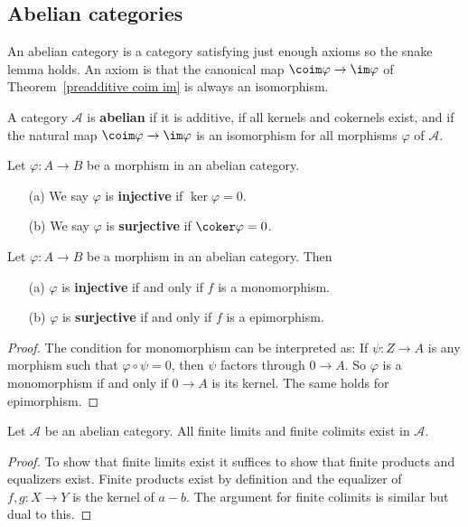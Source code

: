 \subsection{Abelian categories}
An abelian category is a category satisfying just enough axioms so the snake lemma holds. An axiom is that the canonical map $\coim\varphi\to\im\varphi$ of Theorem~\ref{preadditive coim im} is always an isomorphism.
\begin{definition}\label{ab cat def}
A category $\mathcal{A}$ is \textbf{abelian} if it is additive, if all kernels and cokernels exist, and if the natural map $\coim\varphi\to\im\varphi$ is an isomorphism for all morphisms $\varphi$ of $\mathcal{A}$.
\end{definition}
\begin{definition}
Let $\varphi:A\to B$ be a morphism in an abelian category.
\begin{enumerate}
\item[(a)] We say $\varphi$ is \textbf{injective} if $\ker\varphi=0$.
\item[(b)] We say $\varphi$ is \textbf{surjective} if $\coker\varphi=0$.
\end{enumerate}
\end{definition}
\begin{proposition}\label{mono epi iff ker coker}
Let $\varphi:A\to B$ be a morphism in an abelian category. Then
\begin{enumerate}
\item[(a)] $\varphi$ is \textbf{injective} if and only if $f$ is a monomorphism.
\item[(b)] $\varphi$ is \textbf{surjective} if and only if $f$ is a epimorphism.
\end{enumerate}
\end{proposition}
\begin{proof}
The condition for monomorphism can be interpreted as: If $\psi:Z\to A$ is any morphism such that $\varphi\circ\psi=0$, then $\psi$ factors through $0\to A$. So $\varphi$ is a monomorphism if and only if $0\to A$ is its kernel. The same holds for epimorphism.
\end{proof}
\begin{proposition}
Let $\mathcal{A}$ be an abelian category. All finite limits and finite colimits
exist in $\mathcal{A}$.
\end{proposition}
\begin{proof}
To show that finite limits exist it suffices to show that finite products and
equalizers exist. Finite products exist by definition and the equalizer of $f,g:X\to Y$ is the kernel of $a-b$. The argument for finite colimits is similar but dual to this.
\end{proof}
